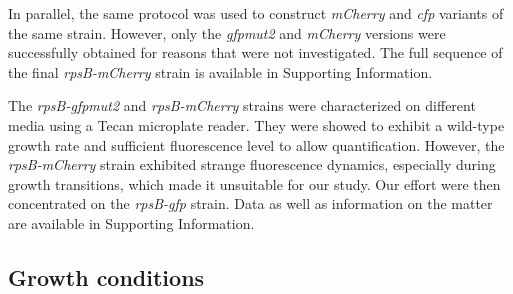In parallel, the same protocol was used to construct \textit{mCherry} and \textit{cfp} variants of the same strain.
However, only the \textit{gfpmut2} and \textit{mCherry} versions were successfully obtained for reasons that were not investigated.
The full sequence of the final \textit{rpsB-mCherry} strain is available in Supporting Information.

The \textit{rpsB-gfpmut2} and \textit{rpsB-mCherry} strains were characterized on different media using a Tecan microplate reader.
They were showed to exhibit a wild-type growth rate and sufficient fluorescence level to allow quantification.
However, the \textit{rpsB-mCherry} strain exhibited strange fluorescence dynamics, especially during growth transitions, which made it unsuitable for our study.
Our effort were then concentrated on the \textit{rpsB-gfp} strain.
Data as well as information on the matter are available in Supporting Information.

\subsection{Growth conditions}
\label{sec:growth_condition}

